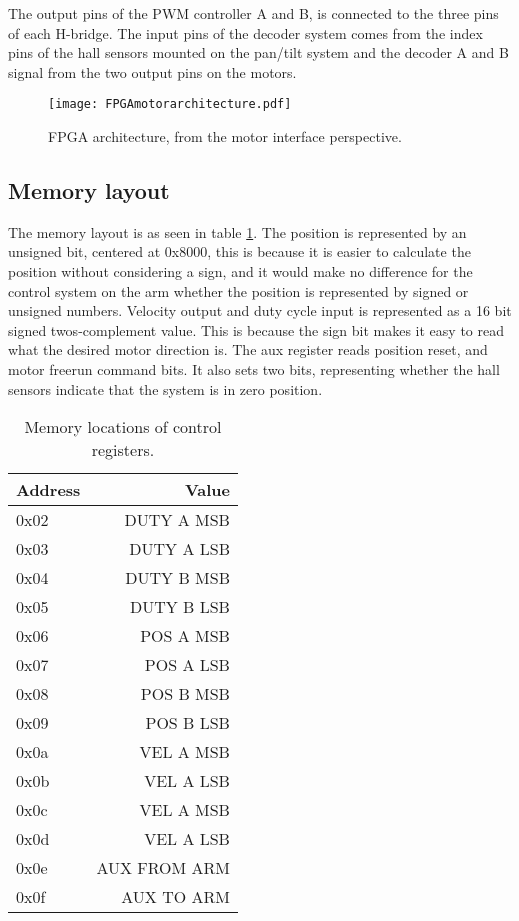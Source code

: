 The output pins of the PWM controller A and B, is connected to the three pins of each H-bridge.
The input pins of the decoder system comes from the index pins of the hall sensors mounted on the pan/tilt system and the decoder A and B signal from the two output pins on the motors.

\begin{figure}[htb]
  \centering
  \texttt{[image: FPGAmotorarchitecture.pdf]}
  \caption{FPGA architecture, from the motor interface perspective.}
  \label{fig:FPGAMotorArchitecture}
\end{figure}

\subsection{Memory layout}
The memory layout is as seen in table \ref{tab:Memorymapping}. The position is represented by an unsigned bit, centered at 0x8000, this is because it is easier to calculate the position without considering a sign, and it would make no difference for the control system on the arm whether the position is represented by signed or unsigned numbers.
Velocity output and duty cycle input is represented as a 16 bit signed twos-complement value.
This is because the sign bit makes it easy to read what the desired motor direction is.
The aux register reads position reset, and motor freerun command bits. It also sets two bits, representing whether the hall sensors indicate that the system is in zero position.



\begin{table}[htb]
\centering
\begin{tabular}{lr}
Address & Value \\
\midrule
0x02 & DUTY A MSB \\
0x03 & DUTY A LSB\\
0x04 & DUTY B MSB\\
0x05 & DUTY B LSB\\
0x06 & POS A MSB\\
0x07 & POS A LSB\\
0x08 & POS B MSB\\
0x09 & POS B LSB\\
0x0a & VEL A MSB\\
0x0b & VEL A LSB\\
0x0c & VEL A MSB\\
0x0d & VEL A LSB\\
0x0e & AUX FROM ARM\\
0x0f & AUX TO ARM\\
\end{tabular}
\caption{Memory locations of control registers.}
\label{tab:Memorymapping}
\end{table}


